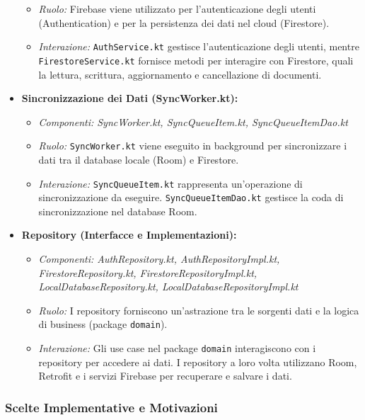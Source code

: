\begin{itemize}
\begin{itemize}
        \item \textit{Ruolo:} Firebase viene utilizzato per l'autenticazione
        degli utenti (Authentication) e per la persistenza dei dati nel cloud
        (Firestore).
        \item \textit{Interazione:} \texttt{AuthService.kt} gestisce
        l'autenticazione degli utenti, mentre\\ \texttt{FirestoreService.kt}
        fornisce metodi per interagire con Firestore, quali la lettura,
        scrittura, aggiornamento e cancellazione di documenti.
    \end{itemize}
    \item \textbf{Sincronizzazione dei Dati (SyncWorker.kt):}
    \begin{itemize}
        \item \textit{Componenti: SyncWorker.kt, SyncQueueItem.kt,
        SyncQueueItemDao.kt}
        \item \textit{Ruolo:} \texttt{SyncWorker.kt} viene eseguito in
        background per sincronizzare i dati tra il database locale (Room) e
        Firestore.
        \item \textit{Interazione:} \texttt{SyncQueueItem.kt} rappresenta
        un'operazione di sincronizzazione da eseguire.
        \texttt{SyncQueueItemDao.kt} gestisce la coda di sincronizzazione nel
        database Room.
    \end{itemize}
    \item \textbf{Repository (Interfacce e Implementazioni):}
    \begin{itemize}
        \item \textit{Componenti: AuthRepository.kt, AuthRepositoryImpl.kt,
        FirestoreRepository.kt, FirestoreRepositoryImpl.kt,
        LocalDatabaseRepository.kt, LocalDatabaseRepositoryImpl.kt}
        \item \textit{Ruolo:} I repository forniscono un'astrazione tra le
        sorgenti dati e la logica di business (package \texttt{domain}).
        \item \textit{Interazione:} Gli use case nel package \texttt{domain}
        interagiscono con i repository per accedere ai dati.
        I repository a loro
        volta utilizzano Room, Retrofit e i servizi Firebase per recuperare e
        salvare i dati.
    \end{itemize}
\end{itemize}

\subsubsection{Scelte Implementative e Motivazioni}

